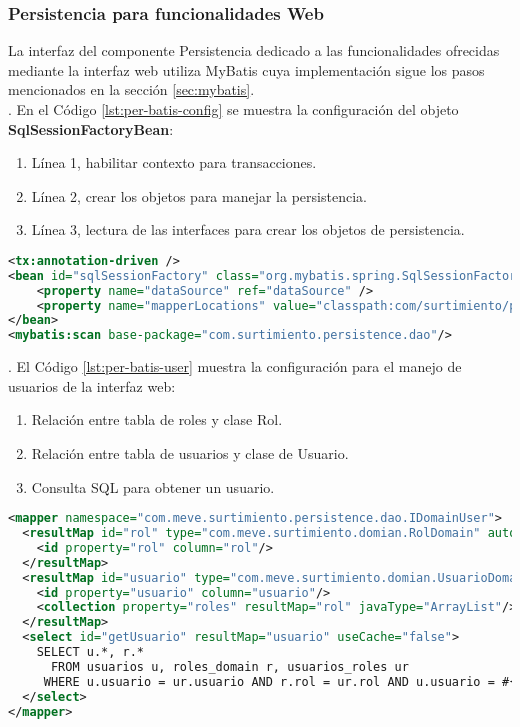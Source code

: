 \subsubsection{Persistencia para funcionalidades Web}\label{sec:persistence-web}
La interfaz del componente Persistencia dedicado a las funcionalidades ofrecidas mediante la interfaz web utiliza MyBatis cuya implementación sigue los pasos mencionados en la sección \ref{sec:mybatis}.\\
. En el Código \ref{lst:per-batis-config} se muestra la configuración del objeto \textbf{SqlSessionFactoryBean}: 
\begin{enumerate}
	\item Línea 1, habilitar contexto para transacciones.
	\item Línea 2, crear los objetos para manejar la persistencia.
	\item Línea 3, lectura de las interfaces para crear los objetos de persistencia.
\end{enumerate}
\begin{lstlisting}[language=XML, caption={Configuración de MyBatis con Spring.}, captionpos=b, label={lst:per-batis-config}]
<tx:annotation-driven />
<bean id="sqlSessionFactory" class="org.mybatis.spring.SqlSessionFactoryBean">
	<property name="dataSource" ref="dataSource" />
	<property name="mapperLocations" value="classpath:com/surtimiento/persistence/dao/*.xml" />
</bean>
<mybatis:scan base-package="com.surtimiento.persistence.dao"/>
\end{lstlisting}

. El Código \ref{lst:per-batis-user} muestra la configuración para el manejo de usuarios de la interfaz web:
\begin{enumerate}
	\item Relación entre tabla de roles y clase Rol.
	\item Relación entre tabla de usuarios y clase de Usuario.
	\item Consulta SQL para obtener un usuario.
\end{enumerate}
\begin{lstlisting}[language=XML, caption={Definición de relación de MyBatis.}, label={
lst:per-batis-user}]
<mapper namespace="com.meve.surtimiento.persistence.dao.IDomainUser">
  <resultMap id="rol" type="com.meve.surtimiento.domian.RolDomain" autoMapping="true">
    <id property="rol" column="rol"/>
  </resultMap>
  <resultMap id="usuario" type="com.meve.surtimiento.domian.UsuarioDomain" autoMapping="true">
    <id property="usuario" column="usuario"/>
    <collection property="roles" resultMap="rol" javaType="ArrayList"/>
  </resultMap>
  <select id="getUsuario" resultMap="usuario" useCache="false">
    SELECT u.*, r.*
      FROM usuarios u, roles_domain r, usuarios_roles ur
     WHERE u.usuario = ur.usuario AND r.rol = ur.rol AND u.usuario = #{0};
  </select>
</mapper>
\end{lstlisting}

